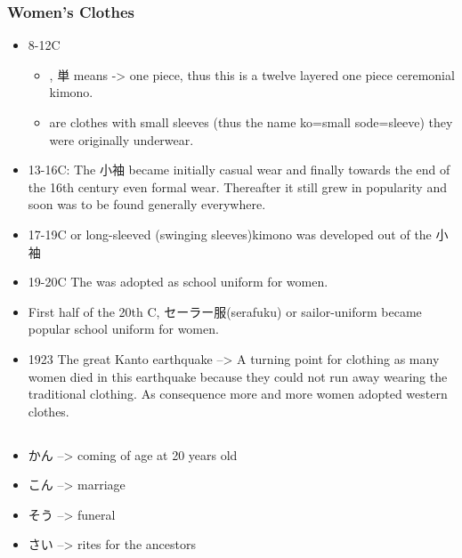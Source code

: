 \documentclass{article}
\begin{document}
\subsubsection*{Women's Clothes}
\begin{itemize}
\item 8-12C
\begin{itemize}
\item {}, 単 means -> one piece, thus this is a twelve layered one piece ceremonial kimono.
\item {} are clothes with small sleeves (thus the name ko=small sode=sleeve) they were originally underwear.
\end{itemize}
\item 13-16C: The 小袖 became initially casual wear and finally towards the end of the 16th century even formal wear. Thereafter it still grew in popularity and soon was to be found generally everywhere.
\item 17-19C  or long-sleeved (swinging sleeves)kimono was developed out of the 小袖
\item 19-20C The  was adopted as school uniform for women.
\item First half of the 20th C, セーラー服(serafuku) or sailor-uniform became popular school uniform for women.
\item 1923 The great Kanto earthquake --> A turning point for clothing as many women died in this earthquake because they could not run away wearing the traditional clothing. As consequence more and more women adopted western clothes.
\end{itemize}
\subsection*{}
\begin{itemize}
\item かん --> coming of age at 20 years old
\item こん --> marriage
\item そう --> funeral
\item さい --> rites for the ancestors
\end{itemize}
\end{document}
